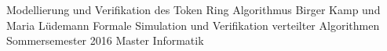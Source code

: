 



\createCoverAndTitlePage
{Modellierung und Verifikation des Token Ring Algorithmus}				%
{Birger Kamp und Maria Lüdemann}												%
{Formale Simulation und Verifikation verteilter Algorithmen \\Sommersemester 2016}	  						%
{Master Informatik}											%
{}																%
{}																%
{}																%
{}											
%	
% 									  													


%	  																							

